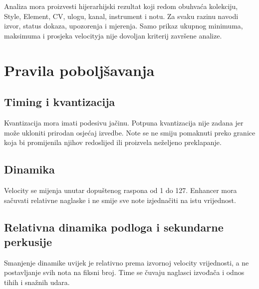 \documentclass[11pt]{article}
\begin{document}
Analiza mora proizvesti hijerarhijski rezultat koji redom obuhvaća kolekciju,
Style, Element, CV, ulogu, kanal, instrument i notu. Za svaku razinu navodi
izvor, status dokaza, upozorenja i mjerenja. Samo prikaz ukupnog minimuma,
maksimuma i prosjeka velocityja nije dovoljan kriterij završene analize.

\section{Pravila poboljšavanja}

\subsection{Timing i kvantizacija}

Kvantizacija mora imati podesivu jačinu. Potpuna kvantizacija nije zadana jer
može ukloniti prirodan osjećaj izvedbe. Note se ne smiju pomaknuti preko granice
koja bi promijenila njihov redoslijed ili proizvela neželjeno preklapanje.

\subsection{Dinamika}

Velocity se mijenja unutar dopuštenog raspona od 1 do 127. Enhancer mora
sačuvati relativne naglaske i ne smije sve note izjednačiti na istu vrijednost.

\subsection{Relativna dinamika podloga i sekundarne perkusije}

Smanjenje dinamike uvijek je relativno prema izvornoj velocity vrijednosti, a
ne postavljanje svih nota na fiksni broj. Time se čuvaju naglasci izvođača i
odnos tihih i snažnih udara.
\end{document}
